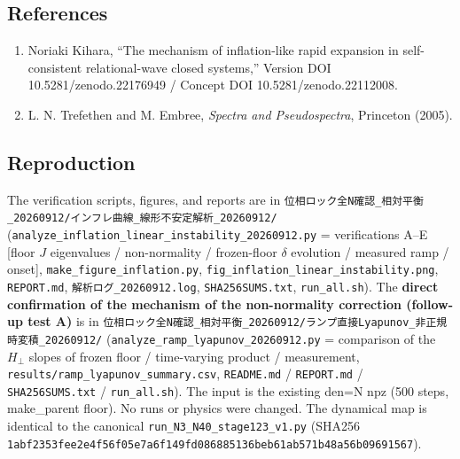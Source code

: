 \documentclass[
  a4paper,
]{ltjsarticle}
\providecommand{\tightlist}{%
  \setlength{\itemsep}{0pt}\setlength{\parskip}{0pt}}
\begin{document}
\subsection{References}\label{references}

\begin{enumerate}
\def\labelenumi{\arabic{enumi}.}
\tightlist
\item
  Noriaki Kihara, ``The mechanism of inflation-like rapid expansion in
  self-consistent relational-wave closed systems,'' Version DOI
  10.5281/zenodo.22176949 / Concept DOI 10.5281/zenodo.22112008.
\item
  L. N. Trefethen and M. Embree, \emph{Spectra and Pseudospectra},
  Princeton (2005).
\end{enumerate}

\subsection{Reproduction}\label{reproduction}

The verification scripts, figures, and reports are in
\texttt{位相ロック全N確認\_相対平衡\_20260912/インフレ曲線\_線形不安定解析\_20260912/}
(\texttt{analyze\_inflation\_linear\_instability\_20260912.py} =
verifications A--E {[}floor \(J\) eigenvalues / non-normality /
frozen-floor \(\delta\) evolution / measured ramp / onset{]},
\texttt{make\_figure\_inflation.py},
\texttt{fig\_inflation\_linear\_instability.png}, \texttt{REPORT.md},
\texttt{解析ログ\_20260912.log}, \texttt{SHA256SUMS.txt},
\texttt{run\_all.sh}). The \textbf{direct confirmation of the mechanism
of the non-normality correction (follow-up test A)} is in
\texttt{位相ロック全N確認\_相対平衡\_20260912/ランプ直接Lyapunov\_非正規時変積\_20260912/}
(\texttt{analyze\_ramp\_lyapunov\_20260912.py} = comparison of the
\(H_\perp\) slopes of frozen floor / time-varying product / measurement,
\texttt{results/ramp\_lyapunov\_summary.csv}, \texttt{README.md} /
\texttt{REPORT.md} / \texttt{SHA256SUMS.txt} / \texttt{run\_all.sh}).
The input is the existing den=N npz (500 steps, make\_parent floor). No
runs or physics were changed. The dynamical map is identical to the
canonical \texttt{run\_N3\_N40\_stage123\_v1.py} (SHA256
\texttt{1abf2353fee2e4f56f05e7a6f149fd086885136beb61ab571b48a56b09691567}).
\end{document}
